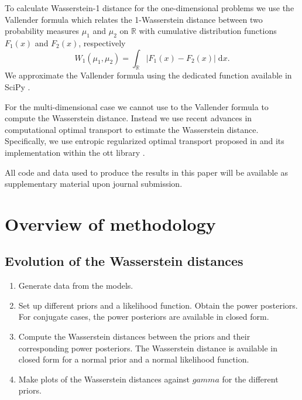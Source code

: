 \documentclass[12pt]{article}
\begin{document}
To calculate Wasserstein-1 distance for the one-dimensional problems we use the
Vallender formula \cite{vallender_calculation_1974} which relates the
1-Wasserstein distance between two probability measures $\mu_1$ and $\mu_2$ on
$\mathbb{R}$ with cumulative distribution functions $F_1(x)$ and $F_2(x)$,
respectively
\begin{equation}
W_1(\mu_1, \mu_2) = \int_{\mathbb{R}} | F_1(x) - F_2(x) | \; \mathrm{d}x.
\end{equation}
We approximate the Vallender formula using the dedicated function available in
SciPy \citep{2020SciPy-NMeth}. 

For the multi-dimensional case we cannot use to the Vallender formula to
compute the Wasserstein distance. Instead we use recent advances in
computational optimal transport to estimate the Wasserstein distance.
Specifically, we use entropic regularized optimal transport proposed in
\citep{NIPS2013_af21d0c9} and its implementation within the \gls{ott} library
\citep{cuturi2022optimal}. 


All code and data used to produce the results in this paper will be available
as supplementary material upon journal submission.

\section{Overview of methodology}
\subsection{Evolution of the Wasserstein distances}
\begin{enumerate}
	\item Generate data from the models.
	\item Set up different priors and a likelihood function. Obtain the power posteriors. For conjugate cases, the power posteriors are available in closed form. 
	\item Compute the Wasserstein distances between the priors and their corresponding power posteriors. The Wasserstein distance is available in closed form for a normal prior and a normal likelihood function. 
	\item Make plots of the Wasserstein distances against $gamma$ for the different priors.
\end{enumerate}
\end{document}
